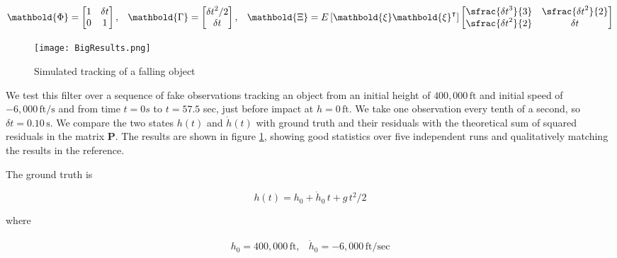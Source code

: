 \documentclass[10pt,oneside,x11names]{article}
\begin{document}
\begin{equation*}
\begin{matrix}
\mathbold{\Phi} =
\begin{bmatrix}
1  & \delta t  \\
0  & 1 
\end{bmatrix}, &
\mathbold{\Gamma} = 
\begin{bmatrix}
{{\delta t}^2}/{2}  \\
\delta t
\end{bmatrix}, &
\mathbold{\Xi} =
E\left[\mathbold{ \xi  }\mathbold{ \xi  }^{ \intercal  }\right]
\begin{bmatrix}
\sfrac { { \delta t }^{ 3 } }{ 3 }  & \sfrac { { \delta t }^{ 2 } }{ 2 }  \\
\sfrac { { \delta t }^{ 2 } }{ 2 }  & \delta t
\end{bmatrix}
\end{matrix}
\end{equation*}

\begin{figure}[htbp]
\centering
\texttt{[image: BigResults.png]}
\caption{\label{fig:orgcba3673}
Simulated tracking of a falling object}
\end{figure}

\noindent We test this filter over a sequence of fake
observations tracking an object from an initial height of \(400,000\,\textrm{ft}\)
and initial speed of \(-6,000\,\textrm{ft}/\textrm{s}\) and from time \(t=\si{0}{s}\)
to \(t=57.5\) sec, just before impact at \(h=0\,\textrm{ft}\). We take one
observation every tenth of a second, so \(\delta t={0.10}\,\textrm{s}\). We compare the
two states \(h(t)\) and \(\dot{h}(t)\) with ground truth and their residuals with
the theoretical sum of squared residuals in the matrix \(\mathbold{P}\). The
results are shown in figure \ref{fig:orgcba3673}, showing good statistics over five
independent runs and qualitatively matching the results in the reference.

The ground truth is

\begin{equation*}
h(t) = h_0 + {\dot{h}}_0\,t + g\,t^2/2
\end{equation*}

\noindent where

\begin{equation*}
\begin{matrix}
h_0 = 400,000\,\textrm{ft}, & {\dot{h}}_0 = -6,000\,\textrm{ft}/\textrm{sec}
\end{matrix}
\end{equation*}
\end{document}
